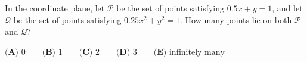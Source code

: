In the coordinate plane, let $\mathcal{P}$ be the set of points satisfying $0.5x+y=1$, and let $\mathcal{Q}$ be the set of points satisfying $0.25x^2+y^2=1$. How many points lie on both $\mathcal{P}$ and $\mathcal{Q}$?

$\textbf{(A) } 0 \qquad\textbf{(B) } 1\qquad\textbf{(C) } 2\qquad\textbf{(D) } 3\qquad\textbf{(E) }\text{infinitely many}$
